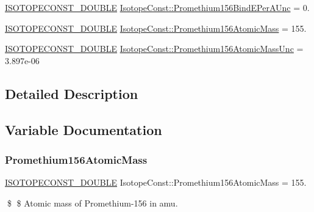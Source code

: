 \begin{DoxyCompactItemize}
\item 
\mbox{\hyperlink{group___isotope_const-_macros_ga8f45a7272ce02c0b4c65c44636ed719a}{I\+S\+O\+T\+O\+P\+E\+C\+O\+N\+S\+T\+\_\+\+D\+O\+U\+B\+LE}} \mbox{\hyperlink{group___isotope_const-_promethium-_pm156_gaa662312ebafd003e76d9aaf44dad3e5c}{Isotope\+Const\+::\+Promethium156\+Bind\+E\+Per\+A\+Unc}} = 0.
\item 
\mbox{\hyperlink{group___isotope_const-_macros_ga8f45a7272ce02c0b4c65c44636ed719a}{I\+S\+O\+T\+O\+P\+E\+C\+O\+N\+S\+T\+\_\+\+D\+O\+U\+B\+LE}} \mbox{\hyperlink{group___isotope_const-_promethium-_pm156_gab0819a8502adc673383555e91d27f590}{Isotope\+Const\+::\+Promethium156\+Atomic\+Mass}} = 155.
\item 
\mbox{\hyperlink{group___isotope_const-_macros_ga8f45a7272ce02c0b4c65c44636ed719a}{I\+S\+O\+T\+O\+P\+E\+C\+O\+N\+S\+T\+\_\+\+D\+O\+U\+B\+LE}} \mbox{\hyperlink{group___isotope_const-_promethium-_pm156_ga6f12d306ca74e2f28f4dd8e86d30629d}{Isotope\+Const\+::\+Promethium156\+Atomic\+Mass\+Unc}} = 3.\+897e-\/06
\end{DoxyCompactItemize}


\subsection{Detailed Description}


\subsection{Variable Documentation}
\mbox{\label{group___isotope_const-_promethium-_pm156_gab0819a8502adc673383555e91d27f590}} 
\subsubsection{\texorpdfstring{Promethium156\+Atomic\+Mass}{Promethium156AtomicMass}}
{\footnotesize\ttfamily \mbox{\hyperlink{group___isotope_const-_macros_ga8f45a7272ce02c0b4c65c44636ed719a}{I\+S\+O\+T\+O\+P\+E\+C\+O\+N\+S\+T\+\_\+\+D\+O\+U\+B\+LE}} Isotope\+Const\+::\+Promethium156\+Atomic\+Mass = 155.}

\$ \$ Atomic mass of Promethium-\/156 in amu. \mbox{\label{group___isotope_const-_promethium-_pm156_ga6f12d306ca74e2f28f4dd8e86d30629d}} 
